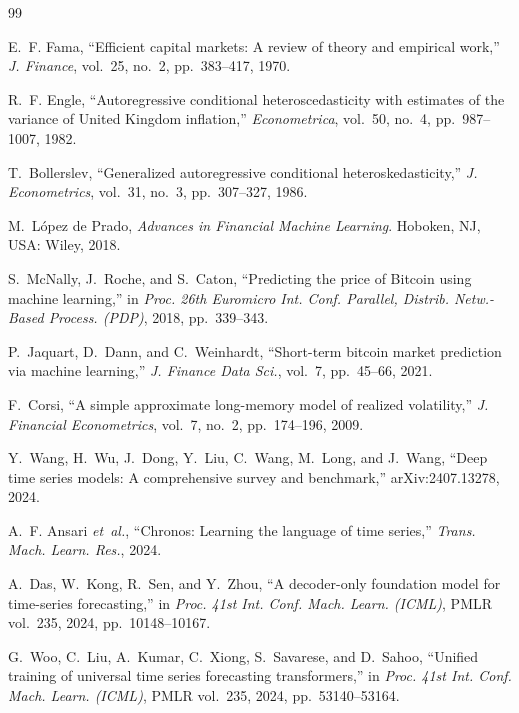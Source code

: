\begin{thebibliography}{99}
\footnotesize

 E.~F. Fama, ``Efficient capital markets: A review of
theory and empirical work,'' \emph{J. Finance}, vol.~25, no.~2,
pp.~383--417, 1970.

 R.~F. Engle, ``Autoregressive conditional
heteroscedasticity with estimates of the variance of United Kingdom
inflation,'' \emph{Econometrica}, vol.~50, no.~4, pp.~987--1007, 1982.

 T.~Bollerslev, ``Generalized autoregressive
conditional heteroskedasticity,'' \emph{J. Econometrics}, vol.~31, no.~3,
pp.~307--327, 1986.

 M.~L\'opez de Prado, \emph{Advances in
Financial Machine Learning}. Hoboken, NJ, USA: Wiley, 2018.

 S.~McNally, J.~Roche, and S.~Caton, ``Predicting
the price of {B}itcoin using machine learning,'' in \emph{Proc. 26th
Euromicro Int. Conf. Parallel, Distrib. Netw.-Based Process. (PDP)},
2018, pp.~339--343.

 P.~Jaquart, D.~Dann, and C.~Weinhardt,
``Short-term bitcoin market prediction via machine learning,''
\emph{J. Finance Data Sci.}, vol.~7, pp.~45--66, 2021.

 F.~Corsi, ``A simple approximate long-memory model of
realized volatility,'' \emph{J. Financial Econometrics}, vol.~7, no.~2,
pp.~174--196, 2009.

 Y.~Wang, H.~Wu, J.~Dong, Y.~Liu, C.~Wang,
M.~Long, and J.~Wang, ``Deep time series models: A comprehensive survey
and benchmark,'' arXiv:2407.13278, 2024.

 A.~F. Ansari \emph{et~al.}, ``Chronos:
Learning the language of time series,'' \emph{Trans. Mach. Learn. Res.},
2024.

 A.~Das, W.~Kong, R.~Sen, and Y.~Zhou, ``A
decoder-only foundation model for time-series forecasting,'' in
\emph{Proc. 41st Int. Conf. Mach. Learn. (ICML)}, PMLR vol.~235, 2024,
pp.~10148--10167.

 G.~Woo, C.~Liu, A.~Kumar, C.~Xiong, S.~Savarese,
and D.~Sahoo, ``Unified training of universal time series forecasting
transformers,'' in \emph{Proc. 41st Int. Conf. Mach. Learn. (ICML)},
PMLR vol.~235, 2024, pp.~53140--53164.


\end{thebibliography}
